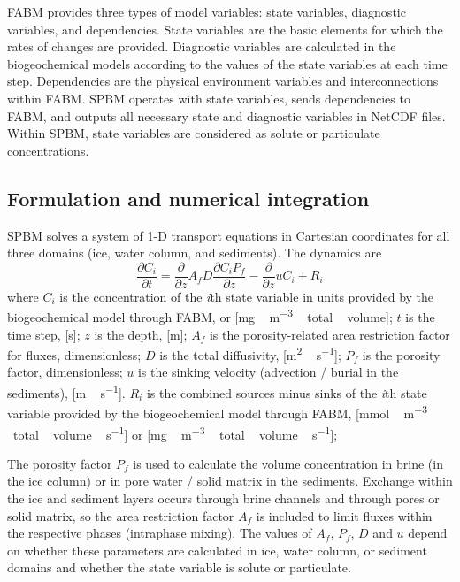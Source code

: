 \documentclass[gmd, manuscript]{copernicus}
\begin{document}
\textrm{FABM} provides three types of model variables: state variables, diagnostic variables, and dependencies.
State variables are the basic elements for which the rates of changes are provided.
Diagnostic variables are calculated in the biogeochemical models according to the values of the state variables at each time step.
Dependencies are the physical environment variables and interconnections within \textrm{FABM}.
\textrm{SPBM} operates with state variables, sends dependencies to \textrm{FABM}, and outputs all necessary state and diagnostic variables in \textrm{NetCDF} files.
Within \textrm{SPBM}, state variables are considered as solute or particulate concentrations.

\subsection{Formulation and numerical integration}
\label{subsec:Formulation}

\textrm{SPBM} solves a system of 1-D transport equations in Cartesian coordinates for all three domains (ice, water column, and sediments).
The dynamics are
\begin{equation}
    \frac{\partial{C_{i}}}{\partial{t}}
    = \frac{\partial{}}{\partial{z}} A_{f} D
    \frac{\partial{C_{i}P_{f}}}{\partial{z}}
    -\frac{\partial{}}{\partial{z}} u C_{i}
    +R_{i}
    \label{eq:1}
\end{equation}
where
$C_{i}$ is the concentration of the \textit{i\/}th state variable in units provided by the biogeochemical model through \textrm{FABM},  or [\unit{mg\,m^{-3}\,total\,volume}];
$t$ is the time step, [\unit{s}];
$z$ is the depth, [\unit{m}];
$A_{f}$ is the porosity-related area restriction factor for fluxes, dimensionless;
$D$ is the total diffusivity, [\unit{m^{2}\,s^{-1}}];
$P_{f}$ is the porosity factor, dimensionless;
$u$ is the sinking velocity (advection / burial in the sediments), [\unit{m\,s^{-1}}].
$R_{i}$ is the combined sources minus sinks of the \textit{i\/}th state variable provided by the biogeochemical model through \textrm{FABM}, [\unit{mmol\,m^{-3}\,total\,volume\,s^{-1}}] or [\unit{mg\,m^{-3}\,total\,volume\,s^{-1}}];

The porosity factor $P_{f}$ is used to calculate the volume concentration in brine (in the ice column) or in pore water / solid matrix in the sediments.
Exchange within the ice and sediment layers occurs through brine channels and through pores or solid matrix, so the area restriction factor $A_{f}$ is included to limit fluxes within the respective phases (intraphase mixing).
The values of $A_{f}$, $P_{f}$, $D$ and $u$ depend on whether these parameters are calculated in ice, water column, or sediment domains and whether the state variable is solute or particulate.
\end{document}
